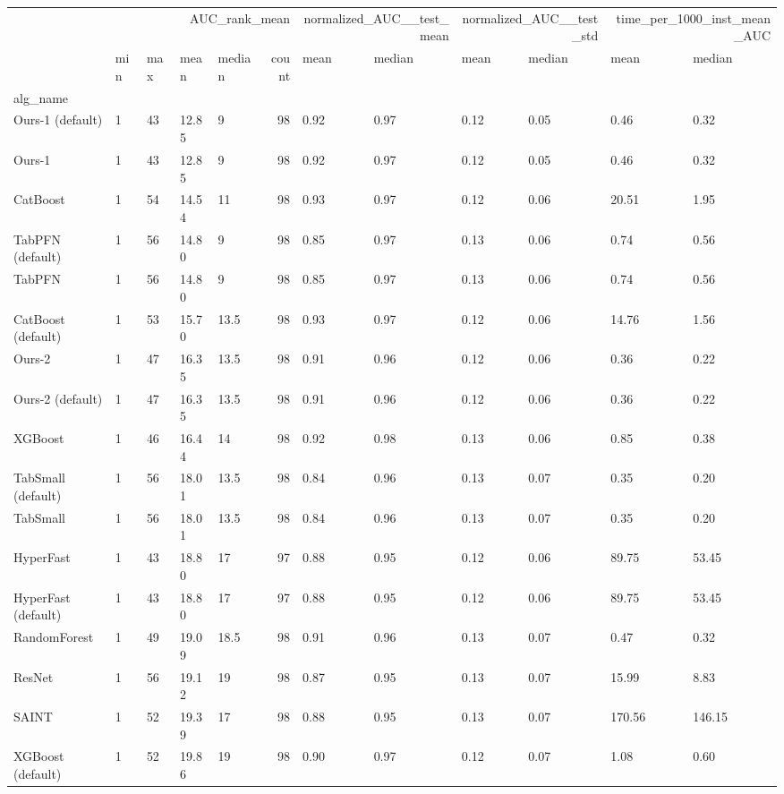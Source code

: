 \begin{tabular}{lllllrllllll}
\toprule
 & \multicolumn{5}{r}{AUC_rank_mean} & \multicolumn{2}{r}{normalized_AUC__test_mean} & \multicolumn{2}{r}{normalized_AUC__test_std} & \multicolumn{2}{r}{time_per_1000_inst_mean_AUC} \\
 & min & max & mean & median & count & mean & median & mean & median & mean & median \\
alg_name &  &  &  &  &  &  &  &  &  &  &  \\
\midrule
Ours-1 (default) & 1 & 43 & 12.85 & 9 & 98 & 0.92 & 0.97 & 0.12 & 0.05 & 0.46 & 0.32 \\
Ours-1 & 1 & 43 & 12.85 & 9 & 98 & 0.92 & 0.97 & 0.12 & 0.05 & 0.46 & 0.32 \\
CatBoost & 1 & 54 & 14.54 & 11 & 98 & 0.93 & 0.97 & 0.12 & 0.06 & 20.51 & 1.95 \\
TabPFN (default) & 1 & 56 & 14.80 & 9 & 98 & 0.85 & 0.97 & 0.13 & 0.06 & 0.74 & 0.56 \\
TabPFN & 1 & 56 & 14.80 & 9 & 98 & 0.85 & 0.97 & 0.13 & 0.06 & 0.74 & 0.56 \\
CatBoost (default) & 1 & 53 & 15.70 & 13.5 & 98 & 0.93 & 0.97 & 0.12 & 0.06 & 14.76 & 1.56 \\
Ours-2 & 1 & 47 & 16.35 & 13.5 & 98 & 0.91 & 0.96 & 0.12 & 0.06 & 0.36 & 0.22 \\
Ours-2 (default) & 1 & 47 & 16.35 & 13.5 & 98 & 0.91 & 0.96 & 0.12 & 0.06 & 0.36 & 0.22 \\
XGBoost & 1 & 46 & 16.44 & 14 & 98 & 0.92 & 0.98 & 0.13 & 0.06 & 0.85 & 0.38 \\
TabSmall (default) & 1 & 56 & 18.01 & 13.5 & 98 & 0.84 & 0.96 & 0.13 & 0.07 & 0.35 & 0.20 \\
TabSmall & 1 & 56 & 18.01 & 13.5 & 98 & 0.84 & 0.96 & 0.13 & 0.07 & 0.35 & 0.20 \\
HyperFast & 1 & 43 & 18.80 & 17 & 97 & 0.88 & 0.95 & 0.12 & 0.06 & 89.75 & 53.45 \\
HyperFast (default) & 1 & 43 & 18.80 & 17 & 97 & 0.88 & 0.95 & 0.12 & 0.06 & 89.75 & 53.45 \\
RandomForest & 1 & 49 & 19.09 & 18.5 & 98 & 0.91 & 0.96 & 0.13 & 0.07 & 0.47 & 0.32 \\
ResNet & 1 & 56 & 19.12 & 19 & 98 & 0.87 & 0.95 & 0.13 & 0.07 & 15.99 & 8.83 \\
SAINT & 1 & 52 & 19.39 & 17 & 98 & 0.88 & 0.95 & 0.13 & 0.07 & 170.56 & 146.15 \\
XGBoost (default) & 1 & 52 & 19.86 & 19 & 98 & 0.90 & 0.97 & 0.12 & 0.07 & 1.08 & 0.60 \\

\end{tabular}
